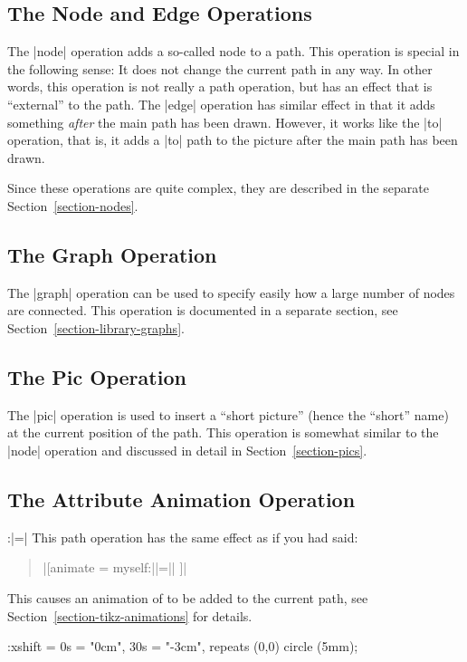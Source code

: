 \subsection{The Node and Edge Operations}

The |node| operation adds a so-called node to a
path. This operation is special in the following sense: It does not
change the current path in any way. In other words, this operation
is not really a path operation, but has an effect that is
``external''  to the path. The |edge| operation has similar effect in
that it adds something \emph{after} the main path has been
drawn. However, it works like the |to| operation, that is, it adds a
|to| path to the picture after the main path has been drawn.

Since these operations are quite complex, they are described in the
separate Section~\ref{section-nodes}.


\subsection{The Graph Operation}

The |graph| operation can be used to specify easily how a large number
of nodes are connected. This operation is documented in a separate
section, see Section~\ref{section-library-graphs}.  


\subsection{The Pic Operation}

The |pic| operation is used to insert a ``short picture'' (hence the
``short'' name) at the current position of the path. This operation is
somewhat similar to the |node| operation and discussed in detail in
Section~\ref{section-pics}.



\subsection{The Attribute Animation Operation}

\begin{pathoperation}{:}{|=|}
  This path operation has the same effect as if you had said:
  \begin{quote}
    |[animate = { myself:||=||} ]|
  \end{quote}
  This causes an animation of  to be added to
  the current path, see Section~\ref{section-tikz-animations} for
  details.  
\begin{codeexample}[width=2cm]
\tikz \draw :xshift = {0s = "0cm", 30s = "-3cm", repeats} (0,0) circle (5mm);
\end{codeexample}
\end{pathoperation}

